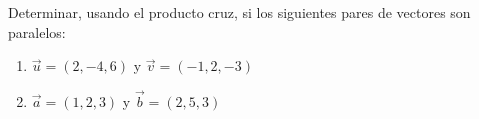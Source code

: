 Determinar, usando el producto cruz, si los siguientes pares de vectores son paralelos:
\begin{enumerate}
    \item $\vec{u} = (2, -4, 6)$ y $\vec{v} = (-1, 2, -3)$
    \item $\vec{a} = (1, 2, 3)$ y $\vec{b} = (2, 5, 3)$
\end{enumerate}